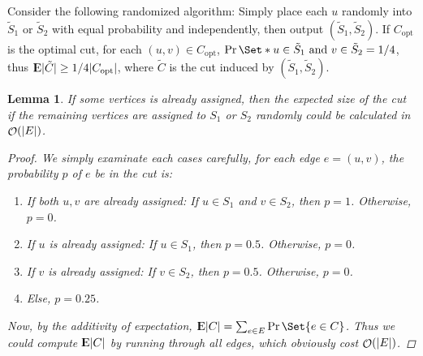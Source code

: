 \documentclass[12pt, a4paper]{article}
\DeclarePairedDelimiter{\abs}{\lvert}{\rvert}
\newtheorem{lemma}{Lemma}
\DeclareMathOperator{\Expect}{{\rm I\kern-.3em E}}
\DeclareMathOperator*{\ord}{\mathcal{O}}
\begin{document}
Consider the following randomized algorithm: Simply place each $u$ randomly into $\tilde{S}_1$
or $\tilde{S}_2$ with equal probability and independently, then output $(\tilde{S}_1, \tilde{S}_2)$.
If $C_{\text{opt}}$ is the optimal cut, for each $(u, v) \in C_{\text{opt}}$,
$\Pr\Set*{ u \in \tilde{S}_1 \text{ and } v \in \tilde{S}_2} = 1/4$, thus
$\Expect \abs{\tilde{C}} \geq 1/4 \abs{C_{\text{opt}}}$, where $\tilde{C}$ is the
cut induced by $(\tilde{S}_1, \tilde{S}_2)$. \smallskip

\begin{lemma} \label{lemma:calc-expected-cut-size}
  If some vertices is already assigned, then the expected size of the cut
  if the remaining vertices are assigned to $S_1$ or $S_2$ randomly could be
  calculated in $\ord(\abs{E})$.

  \begin{proof}
    We simply examinate each cases carefully, for each edge $e = (u, v)$, the probability $p$
    of $e$ be in the cut is:
    \begin{enumerate}
      \item If both $u, v$ are already assigned: If $u \in S_1$ and $v \in S_2$, then $p = 1$.
        Otherwise, $p = 0$.
      \item If $u$ is already assigned: If $u \in S_1$, then $p = 0.5$.  Otherwise, $p = 0$.
      \item If $v$ is already assigned: If $v \in S_2$, then $p = 0.5$.  Otherwise, $p = 0$.
      \item Else, $p = 0.25$.
    \end{enumerate}
    Now, by the additivity of expectation, $\Expect \abs{C} = \sum_{e \in E} \Pr\Set{ e \in C }$.
    Thus we could compute $\Expect \abs{C}$ by running through all edges, which obviously cost $\ord(\abs{E})$.
  \end{proof}
\end{lemma}
\end{document}
